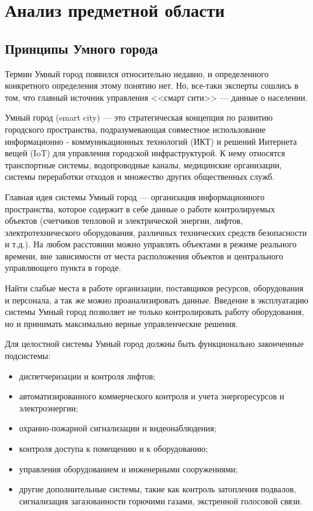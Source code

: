 
\section{Анализ предметной области}
\subsection{Принципы Умного города}
Термин Умный город появился относительно недавно, и определенного конкретного определения этому понятию нет. Но, все-таки  эксперты сошлись в том, что главный источник управления <<смарт сити>> --- данные о населении.

Умный город (smart city) --- это стратегическая концепция по развитию городского пространства, подразумевающая совместное использование информационно - коммуникационных технологий (ИКТ) и решений Интернета вещей (IoT) для управления городской инфраструктурой. К нему относятся транспортные системы, водопроводные каналы, медицинские организации, системы переработки отходов и множество других общественных служб. \cite{Harrison} 

Главная идея системы Умный город --- организация информационного пространства, которое содержит в себе данные о работе контролируемых объектов (счетчиков тепловой и электрической энергии, лифтов, электротехнического оборудования, различных технических средств безопасности и т.д.). На любом расстоянии можно управлять объектами в режиме реального времени, вне зависимости от места расположения объектов и центрального управляющего пункта в городе.\cite{NK}

Найти слабые места в работе организации, поставщиков ресурсов, оборудования и персонала, а так же можно проанализировать данные. Введение в эксплуатацию системы Умный город позволяет не только контролировать работу оборудования, но и принимать максимально верные управленческие решения. 

Для целостной системы Умный город должны быть функционально законченные подсистемы:
\begin{itemize}
	\item диспетчеризации и контроля лифтов; 
	\item автоматизированного коммерческого контроля и учета энергоресурсов и электроэнергии; 
	\item охранно-пожарной сигнализации и видеонаблюдения; 
	\item контроля доступа к помещению и к оборудованию; 
	\item управления оборудованием и инженерными сооружениями; 
	\item другие дополнительные системы, такие как контроль затопления подвалов, сигнализация загазованности горючими газами, экстренной голосовой связи.
\end{itemize}

